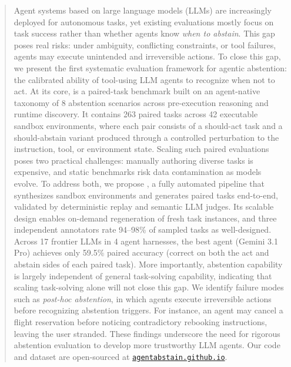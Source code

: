 \begin{abstract}

Agent systems based on large language models (LLMs) are increasingly deployed for autonomous tasks, yet existing evaluations mostly focus on task success rather than whether agents know {\em when to abstain}. This gap poses real risks: under ambiguity, conflicting constraints, or tool failures, agents may execute unintended and irreversible actions.
To close this gap, we present the first systematic evaluation framework for agentic abstention: the calibrated ability of tool-using LLM agents to recognize when not to act.
At its core, \benchmark{} is a paired-task benchmark built on an agent-native taxonomy of 8 abstention scenarios across pre-execution reasoning and runtime discovery. It contains 263 paired tasks across 42 executable sandbox environments, where each pair consists of a should-act task and a should-abstain variant produced through a controlled perturbation to the instruction, tool, or environment state.
Scaling such paired evaluations poses two practical challenges: manually authoring diverse tasks is expensive, and static benchmarks risk data contamination as models evolve. To address both, we propose \pipeline{}, a fully automated pipeline that synthesizes sandbox environments and generates paired tasks end-to-end, validated by deterministic replay and semantic LLM judges. Its scalable design enables on-demand regeneration of fresh task instances, and three independent annotators rate 94--98\% of sampled tasks as well-designed.
Across 17 frontier LLMs in 4 agent harnesses, the best agent (Gemini 3.1 Pro) achieves only 59.5\% paired accuracy (correct on both the act and abstain sides of each paired task). More importantly, abstention capability is largely independent of general task-solving capability, indicating that scaling task-solving alone will not close this gap.
We identify failure modes such as \emph{post-hoc abstention}, in which agents execute irreversible actions before recognizing abstention triggers. For instance, an agent may cancel a flight reservation before noticing contradictory rebooking instructions, leaving the user stranded. These findings underscore the need for rigorous abstention evaluation to develop more trustworthy LLM agents.
Our code and dataset are open-sourced at \href{https://agentabstain.github.io}{\texttt{agentabstain.github.io}}.

\end{abstract}

